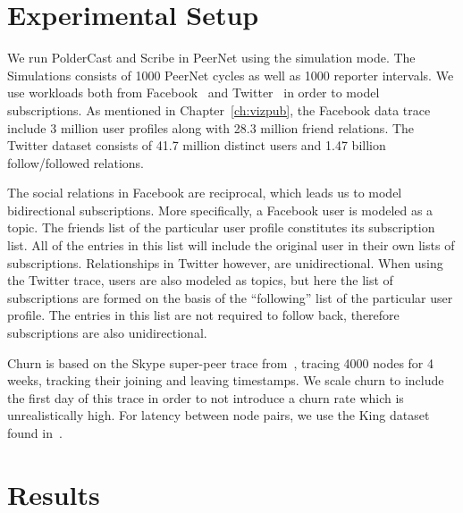 \section{Experimental Setup}

We run PolderCast and Scribe in PeerNet using the simulation mode. The
Simulations consists of 1000 PeerNet cycles as well as 1000 reporter
intervals. We use workloads both from Facebook~\cite{facebook-eurosys09} and
Twitter~\cite{Kwak10www} in order to model subscriptions. As mentioned in
Chapter~\ref{ch:vizpub}, the Facebook data trace include 3 million user
profiles along with 28.3 million friend relations. The Twitter dataset
consists of 41.7 million distinct users and 1.47 billion
follow/followed relations.

The social relations in Facebook are reciprocal, which leads us to model
bidirectional subscriptions. More specifically, a Facebook user is
modeled as a topic. The friends list of the particular user profile
constitutes its subscription list. All of the entries in this list will
include the original user in their own lists of subscriptions.
Relationships in Twitter however, are unidirectional. When using the
Twitter trace, users are also modeled as topics, but here the list of
subscriptions are formed on the basis of the ``following'' list of the
particular  user profile. The entries in this list are not required to
follow back, therefore subscriptions are also unidirectional.

Churn is based on the Skype super-peer trace from~\cite{Guha:2006}, tracing 4000
nodes for 4 weeks, tracking their joining and leaving timestamps. We
scale churn to include the first day of this trace in order to not
introduce a churn rate which is unrealistically high. For latency
between node pairs, we use the King dataset found in~\cite{king}.

\section{Results}

